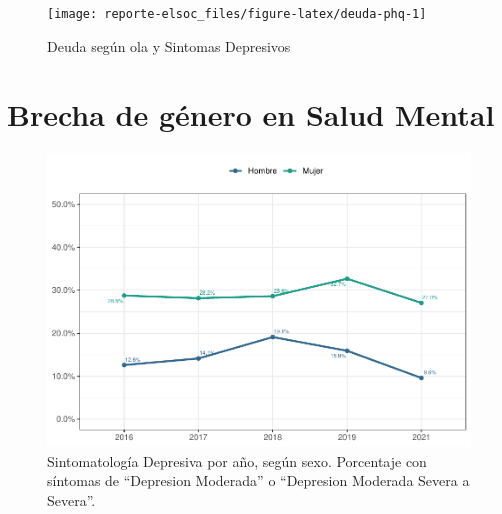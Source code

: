 \documentclass[
  12pt,
  openany]{book}
\begin{document}
\begin{figure}

{\centering \texttt{[image: reporte-elsoc\_files/figure-latex/deuda-phq-1]} 

}

\caption{Deuda según ola y Sintomas Depresivos}\label{fig:deuda-phq}
\end{figure}

\hypertarget{brecha-de-guxe9nero-en-salud-mental}{%
\section{Brecha de género en Salud Mental}\label{brecha-de-guxe9nero-en-salud-mental}}

\begin{figure}

{\centering \includegraphics{reporte-elsoc_files/figure-latex/depre-year-sexo-1} 

}

\caption{Sintomatología Depresiva por año, según sexo. Porcentaje con síntomas de “Depresion Moderada” o “Depresion Moderada Severa a Severa”.}\label{fig:depre-year-sexo}
\end{figure}
\end{document}
